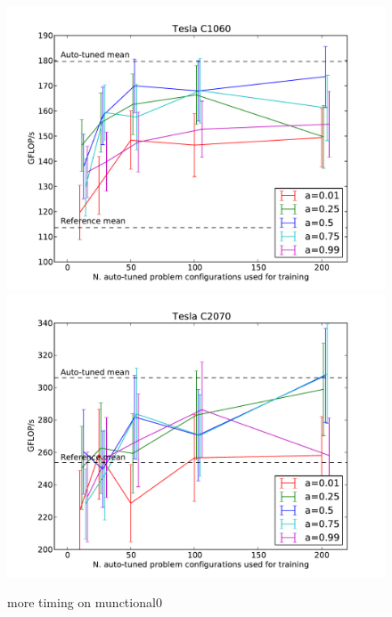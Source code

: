 \documentclass{sig-alternate}
\begin{document}
\begin{figure}
\centering
\includegraphics[scale=.42]{fig_ntrain_munctional0_1060.pdf}
\includegraphics[scale=.42]{fig_ntrain_munctional0_2070.pdf}
\caption{more timing on munctional0}
\label{fig:fig_ntrain}
\end{figure}
\end{document}
